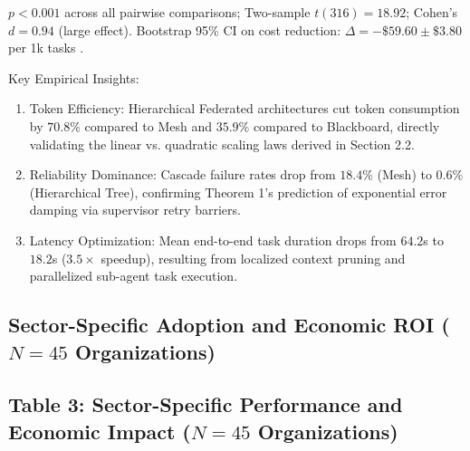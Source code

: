 \documentclass[10pt,twocolumn,letterpaper]{article}
\begin{document}
$p < 0.001$ across all pairwise comparisons; Two-sample $t(316) = 18.92$; Cohen's $d = 0.94$ (large effect). Bootstrap 95\% CI on cost reduction: $\Delta = -\$59.60 \pm \$3.80$ per 1k tasks \cite{arxiv_2404_01131,crossref_10_1201_9788743808145_14}.

Key Empirical Insights:
\begin{enumerate}
  \item Token Efficiency: Hierarchical Federated architectures cut token consumption by $70.8\%$ compared to Mesh and $35.9\%$ compared to Blackboard, directly validating the linear vs. quadratic scaling laws derived in Section 2.2.
  \item Reliability Dominance: Cascade failure rates drop from $18.4\%$ (Mesh) to $0.6\%$ (Hierarchical Tree), confirming Theorem 1's prediction of exponential error damping via supervisor retry barriers.
  \item Latency Optimization: Mean end-to-end task duration drops from $64.2$s to $18.2$s ($3.5\times$ speedup), resulting from localized context pruning and parallelized sub-agent task execution.
\end{enumerate}




\subsection{Sector-Specific Adoption and Economic ROI ($N = 45$ Organizations)}



\subsection{Table 3: Sector-Specific Performance and Economic Impact ($N = 45$ Organizations)}
\begin{table}[htbp]
\centering
{}
\end{table}
\end{document}
